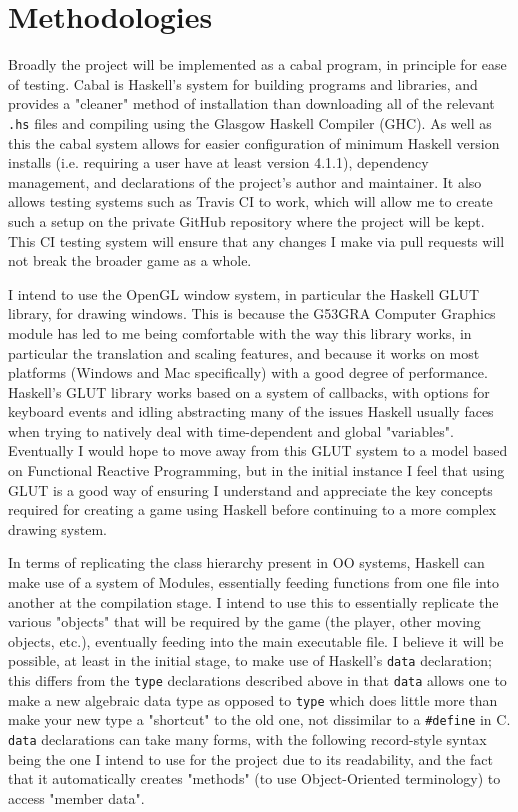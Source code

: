 \documentclass[12pt, a4paper]{report}
\begin{document}
\section{Methodologies}
Broadly the project will be implemented as a cabal program, in principle for ease of testing.
Cabal is Haskell's system for building programs and libraries\cite{cabal}, and provides a "cleaner" method of installation than downloading all of the relevant \verb|.hs| files and compiling using the Glasgow Haskell Compiler (GHC).
As well as this the cabal system allows for easier configuration of minimum Haskell version installs (i.e. requiring a user have at least version 4.1.1), dependency management, and declarations of the project's author and maintainer.
It also allows testing systems such as Travis CI to work\cite{travisci}, which will allow me to create such a setup on the private GitHub repository where the project will be kept.
This CI testing system will ensure that any changes I make via pull requests will not break the broader game as a whole.

\par

I intend to use the OpenGL window system, in particular the Haskell GLUT library, for drawing windows.
This is because the G53GRA Computer Graphics module has led to me being comfortable with the way this library works, in particular the translation and scaling features, and because it works on most platforms (Windows and Mac specifically) with a good degree of performance.
Haskell's GLUT library works based on a system of callbacks\cite{glutpage}, with options for keyboard events and idling abstracting many of the issues Haskell usually faces when trying to natively deal with time-dependent and global "variables".
Eventually I would hope to move away from this GLUT system to a model based on Functional Reactive Programming, but in the initial instance I feel that using GLUT is a good way of ensuring I understand and appreciate the key concepts required for creating a game using Haskell before continuing to a more complex drawing system.

\par

In terms of replicating the class hierarchy present in OO systems, Haskell can make use of a system of Modules, essentially feeding functions from one file into another at the compilation stage.
I intend to use this to essentially replicate the various "objects" that will be required by the game (the player, other moving objects, etc.), eventually feeding into the main executable file.
I believe it will be possible, at least in the initial stage, to make use of Haskell's \verb|data| declaration; this differs from the \verb|type| declarations described above in that \verb|data| allows one to make a new algebraic data type as opposed to \verb|type| which does little more than make your new type a "shortcut" to the old one, not dissimilar to a \verb|#define| in C.
\verb|data| declarations can take many forms, with the following record-style syntax being the one I intend to use for the project due to its readability, and the fact that it automatically creates "methods" (to use Object-Oriented terminology) to access "member data".
\end{document}
